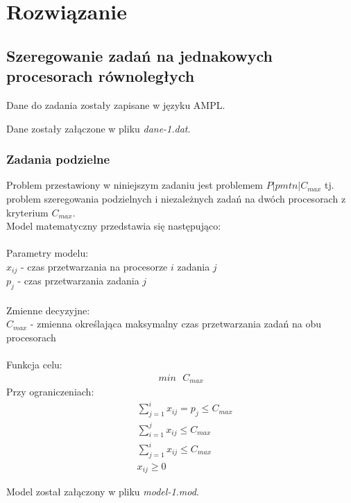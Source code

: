 \documentclass[
    12pt, %
]{../fphw}
\begin{document}
\newpage
\section{Rozwiązanie}
\subsection{Szeregowanie zadań na jednakowych procesorach równoległych}
Dane do zadania zostały zapisane w języku AMPL.

Dane zostały załączone w pliku \textit{dane-1.dat}.
\subsubsection{Zadania podzielne}
Problem przestawiony w niniejszym zadaniu jest problemem \(P|pmtn|C_{max}\)
tj. problem szeregowania podzielnych i niezależnych zadań na dwóch procesorach z kryterium \(C_{max}\). \\
Model matematyczny przedstawia się następująco: \\ \\
Parametry modelu: \\
\(x_{ij}\) - czas przetwarzania na procesorze \(i\) zadania \(j\) \\
\(p_j\) - czas przetwarzania zadania \(j\) \\ \\
Zmienne decyzyjne: \\
\(C_{max}\) - zmienna określająca maksymalny czas przetwarzania zadań na obu procesorach \\ \\
Funkcja celu: \\
\begin{align*}
    min \text{ } C_{max}
\end{align*}
Przy ograniczeniach: \\
\begin{align*}
     & \sum^i_{j=1}x_{ij} = p_j \leq C_{max} \\
     & \sum^j_{i=1}x_{ij} \leq C_{max}       \\
     & \sum^i_{j=1}x_{ij} \leq C_{max}       \\
     & x_{ij} \geq 0
\end{align*}

\newpage


Model został załączony w pliku \textit{model-1.mod}.
\end{document}
